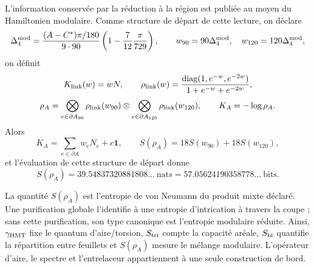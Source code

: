 L’information conservée par la réduction à la région est publiée au moyen du
Hamiltonien modulaire. Comme structure de départ de cette lecture, on déclare
\[
 \Delta_4^{\rm mod}
 =\frac{(A-C^*)\pi/180}{9\cdot90}
 \left(1-\frac7{12}\frac\pi{729}\right),
 \qquad w_{90}=90\Delta_4^{\rm mod},\quad
 w_{120}=120\Delta_4^{\rm mod},
\]
on définit
\[
 K_{\rm link}(w)=wN,
 \qquad
 \rho_{\rm link}(w)=
 \frac{\operatorname{diag}(1,e^{-w},e^{-2w})}
 {1+e^{-w}+e^{-2w}},
\]
\begin{equation}
 \rho_A=
 \bigotimes_{e\in\partial A_{90}}\rho_{\rm link}(w_{90})
 \otimes
 \bigotimes_{e\in\partial A_{120}}\rho_{\rm link}(w_{120}),
 \qquad K_A=-\log\rho_A.
 \label{hap:eq:estado-hamiltoniano-modular-barbero-rev11}
\end{equation}
Alors
\[
 K_A=\sum_{e\in\partial A}w_eN_e+c\mathbf1,
 \qquad
 S(\rho_A)=18S(w_{90})+18S(w_{120}),
\]
et l’évaluation de cette structure de départ donne
\[
 S(\rho_A)=39.54837320881808\ldots\ \text{nats}
 =57.05624190358778\ldots\ \text{bits}.
\]

La quantité \(S(\rho_A)\) est l’entropie de von Neumann du produit mixte
déclaré. Une purification globale l’identifie à une entropie
d’intrication à travers la coupe ; sans cette purification, son type canonique est
l’entropie modulaire réduite. Ainsi, \(\gamma_{\rm HMT}\) fixe le quantum
d’aire/torsion, \(S_{\rm tri}\) compte la capacité aréale, \(S_{\rm bi}\)
quantifie la répartition entre feuillets et \(S(\rho_A)\) mesure le mélange modulaire.
L’opérateur d’aire, le spectre et l’entrelaceur appartiennent à une seule construction
de bord.
